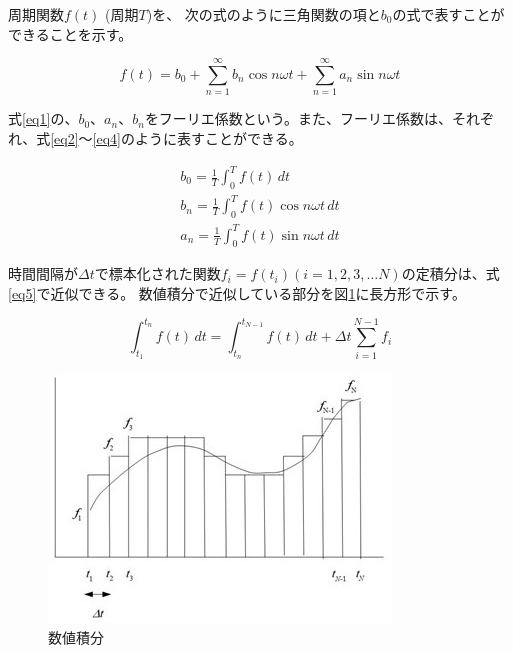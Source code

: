 周期関数$f(t)$ (周期$T$)を、
次の式のように三角関数の項と$b_0$の式で表すことができることを示す。
\begin{screen}
  \begin{equation}
    f(t) = b_0+\sum_{n = 1}^{\infty} b_n \cos n\omega t + \sum_{n = 1}^{\infty} a_n \sin n\omega t \label{eq1}
  \end{equation}
\end{screen}
  
式\eqref{eq1}の、$b_0$、$a_n$、$b_n$をフーリエ係数という。また、フーリエ係数は、それぞれ、式\eqref{eq2}～\eqref{eq4}のように表すことができる。

\begin{screen}  
  \begin{gather}
    b_0 = \frac{1}{T}\int_{0}^{T}f(t) \,dt \label{eq2} \\
    b_n = \frac{1}{T}\int_{0}^{T}f(t)\cos n\omega t \,dt \label{eq3} \\
    a_n = \frac{1}{T}\int_{0}^{T}f(t)\sin n\omega t \,dt \label{eq4}
  \end{gather}
\end{screen}

時間間隔が$\varDelta t$で標本化された関数$f_i = f(t_i) (i = 1, 2, 3, \dots N)$の定積分は、式\eqref{eq5}で近似できる。
数値積分で近似している部分を図\ref{im3}に長方形で示す。
\begin{screen} 
  \begin{equation}
    \int_{t_1}^{t_n}f(t) \,dt = \int_{t_n}^{t_{N-1}}f(t) \,dt + \varDelta t \sum_{i = 1}^{N-1}f_i \label{eq5}
  \end{equation}
\end{screen}

\begin{figure}[htbp]
  \begin{center}
  \includegraphics[width=.5\linewidth]{img/4.jpg}
  \caption{数値積分}
  \label{im3}
  \end{center}
\end{figure}